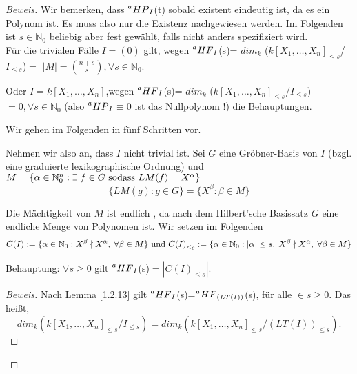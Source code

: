 \documentclass{article}
\newcommand*{\R}{k[X_{1},\ldots,X_{n}]}
\newcommand*{\indx}[2]{{#1}_{#2}}
\newcommand*{\potx}[2]{{#1}^{#2}}
\newcommand*{\N}{\mathbb{N}_0}
\newcommand*{\hf}[1]{$\prescript{a}{}{HF}_{#1}$}
\newcommand*{\hp}[1]{$\prescript{a}{}{HP}_{#1}$}
\begin{document}
\begin{proof}[Beweis]
	Wir bemerken, dass \hp{I}(t) sobald existent eindeutig ist, da es ein Polynom ist. Es muss also nur die Existenz nachgewiesen werden. Im Folgenden ist $s\in \N$ beliebig aber fest gewählt, falls nicht anders spezifiziert wird.\\
	
	Für die trivialen Fälle $I=(0)$ gilt, wegen \hf{I}(s)= $\indx{dim}{k}$ ($\indx{\R}{\leq s}$/$\indx{I}{\leq s}$)$=$ $\left|M\right|=\binom{n+s}{s}, \forall s\in \N$.
	
	Oder $I=\R$,wegen \hf{I}(s)= $\indx{dim}{k}$ ($\indx{\R}{\leq s}$/$\indx{I}{\leq s}$)$=0, \forall s\in \N$  (also \hp{I}$\equiv0$ ist das Nullpolynom !) die Behauptungen.
	
	
	Wir gehen im Folgenden in fünf Schritten vor.\\
	\begin{compactenum}
		
		\item Nehmen wir also an, dass $I$ nicht trivial ist. Sei $G$ eine Gröbner-Basis von $I$ (bzgl. eine graduierte lexikographische Ordnung) und $M=\{\alpha \in \N^n:\exists\;f\in G \textnormal{ sodass } LM(f)=\potx{X}{\alpha}\}$
		\begin{displaymath}
		\{LM(g):g\in G\}=\{\potx{X}{\beta}:\beta \in M \}
		\end{displaymath}
		
		Die Mächtigkeit von $M$ ist endlich , da nach dem Hilbert'sche Basissatz $G$ eine endliche Menge von Polynomen ist.
		Wir setzen im Folgenden 
		\begin{displaymath}
		C(I):=\{\alpha \in \N: \potx{X}{\beta} \nmid \potx{X}{\alpha},\; \forall \beta \in M \}
		\textnormal{ und } 
		\indx{C(I)}{\leq s}:= \{\alpha \in \N:|\alpha|\leq s, \; \potx{X}{\beta} \nmid \potx{X}{\alpha},\; \forall \beta \in M \}
		\end{displaymath}
		
		Behauptung: $\forall s\geq 0$ gilt \hf{I}(s)$=|\indx{C(I)}{\leq s}|$.\\
		
		\begin{proof}[Beweis]
			Nach Lemma \ref{1.2.13} gilt \hf{I}(s)=\hf{(LT(I))}(s), für alle $ \in s\geq0$. Das heißt,
			\begin{displaymath}
			\indx{dim}{k} (\indx{\R}{\leq s}/\indx{I}{\leq s})=\indx{dim}{k}(\indx{\R}{\leq s}/\indx{(LT(I))}{\leq s}).
			\end{displaymath}
			

\end{proof}
\end{compactenum}
\end{proof}
\end{document}
